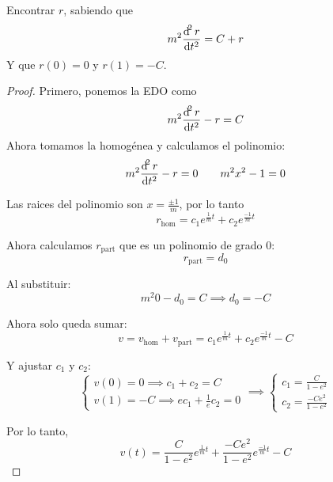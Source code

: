 \documentclass[a4paper]{article}
\newcommand{\dv}[3][]{\frac{\dif^{#1} #2}{\dif #3^{#1}}}
\begin{document}
\begin{example}
  Encontrar $r$, sabiendo que
  \[
    m^2 \dv[2]{r}{t} = C + r
  \]
  Y que $r(0) = 0$ y $r(1) = -C$.
\end{example}
\begin{proof}
  Primero, ponemos la EDO como
  \[
    m^2 \dv[2]{r}{t} - r = C
  \]
  Ahora tomamos la homogénea y calculamos el polinomio:
  \[
    m^2 \dv[2]{r}{t} - r = 0 \qquad m^2 x^2 - 1 = 0
  \]

  Las raices del polinomio son $x = \frac{\pm 1}{m}$, por lo tanto
  \[
    r_{\text{hom}} = c_1 e^{\frac{1}{m} t} + c_2 e^{\frac{- 1}{m} t}
  \]

  Ahora calculamos $r_{\text{part}}$ que es un polinomio de grado 0:
  \[
    r_{\text{part}} = d_0
  \]

  Al substituir:
  \[
    m^2 0 - d_0 = C \implies d_0 = -C
  \]

  Ahora solo queda sumar:
  \[
    v = v_{\text{hom}} + v_{\text{part}} = c_1 e^{\frac{1}{m} t} + c_2 e^{\frac{-1}{m} t} - C
  \]

  Y ajustar $c_1$ y $c_2$:
  \[
    \begin{cases}
      v(0) = 0 \implies c_1 + c_2 = C \\
      v(1) = -C \implies e c_1 + \frac{1}{e} c_2 = 0
    \end{cases}
    \implies
    \begin{cases}
      c_1 = \frac{C}{1 - e^2} \\
      c_2 = \frac{-Ce^2}{1-e^2}
    \end{cases}
  \]

  Por lo tanto,
  \[
    v(t) = \frac{C}{1 - e^2} e^{\frac{1}{m} t} + \frac{-Ce^2}{1-e^2} e^{\frac{-1}{m} t} - C
  \]
\end{proof}
\end{document}
